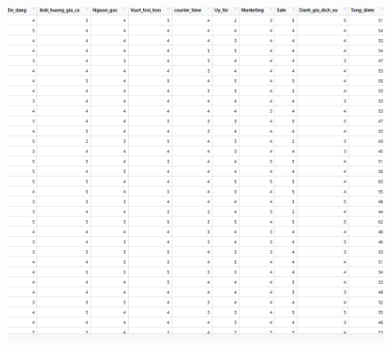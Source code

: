 \documentclass[a4paper]{article}
\theoremstyle{definition}
\begin{document}
\begin{itemize}
\begin{itemize}
\begin{enumerate}
\begin{figure}[H]
        \includegraphics[scale=0.55]{rieng_2.png}
        \label{fig:my_label}
    \end{figure}
    

\end{enumerate}
\end{itemize}
\end{itemize}
\end{document}
